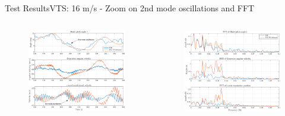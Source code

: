 
\begin{frame}{Test Results}{VTS: 16 m/s - Zoom on 2nd mode oscillations and FFT}
	
	\begin{columns}
		\begin{column}{.49\textwidth}
			\begin{figure}[ht]
				\centering
				\includegraphics[width=1\linewidth]{../Graphics/TestResults/VTSplotting/12_zoom_th_w_vy.png}
				\label{fig:vts_12_zoom_th_w_py_vy}
			\end{figure}
		\end{column}
		
		\begin{column}{.49\textwidth}
			\begin{figure}[h]
				\centering
				\includegraphics[width=1\linewidth]{../Graphics/TestResults/VTSplotting/11_fft_th_w_py.png}
				\label{fig:vts_11_fft_th_w_py_vy}
			\end{figure}
		\end{column}
		

\end{columns}
\end{frame}
